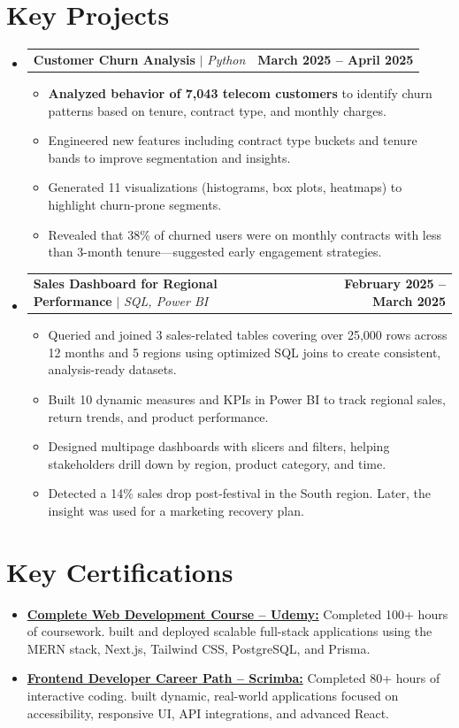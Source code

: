 \documentclass[letterpaper,11pt]{article}
\makeatletter
\newcommand{\resumeItem}[1]{\item\small{{#1 \vspace{-2pt}}}}
\newcommand{\resumeProjectHeading}[2]{
    \item
    \begin{tabular*}{1.001\textwidth}{l@{\extracolsep{\fill}}r}
      \small#1 & \textbf{\small #2}\\
    \end{tabular*}\vspace{-6pt}
}
\newcommand{\resumeItemListStart}{\begin{itemize}}
\newcommand{\resumeItemListEnd}{\end{itemize}\vspace{-5pt}}
\newcommand{\resumeSubHeadingListStart}{\begin{itemize}[leftmargin=0.0in, label={}]}
\newcommand{\resumeSubHeadingListEnd}{\end{itemize}}
\makeatother
\begin{document}
\section{Key Projects}
\resumeSubHeadingListStart
  \resumeProjectHeading
      {\textbf{Customer Churn Analysis} $|$ \emph{Python }}{March 2025 -- April 2025}
      \resumeItemListStart
        \resumeItem{\textbf{Analyzed behavior of 7,043 telecom customers} to identify churn patterns based on tenure, contract type, and monthly charges.}
        \resumeItem{Engineered new features including contract type buckets and tenure bands to improve segmentation and insights.}
        \resumeItem{Generated 11 visualizations (histograms, box plots, heatmaps) to highlight churn-prone segments.}
        \resumeItem{Revealed that 38\% of churned users were on monthly contracts with less than 3-month tenure—suggested early engagement strategies.}
      \resumeItemListEnd
  \resumeProjectHeading
      {\textbf{Sales Dashboard for Regional Performance} $|$ \emph{SQL, Power BI}}{February 2025 -- March 2025}
      \resumeItemListStart
        \resumeItem{Queried and joined 3 sales-related tables covering over 25,000 rows across 12 months and 5 regions using optimized SQL joins to create consistent, analysis-ready datasets.}
        \resumeItem{Built 10 dynamic measures and KPIs in Power BI to track regional sales, return trends, and product performance.}
        \resumeItem{Designed multipage dashboards with slicers and filters, helping stakeholders drill down by region, product category, and time.}
        \resumeItem{Detected a 14\% sales drop post-festival in the South region. Later, the insight was used for a marketing recovery plan.}
      \resumeItemListEnd
\resumeSubHeadingListEnd

\section{Key Certifications}
\resumeItemListStart
  \resumeItem{\href{https://www.udemy.com/certificate/UC-689a510e-ba1f-4bde-a747-4dcb60be473f/}{\textbf{Complete Web Development Course – Udemy:}} Completed 100+ hours of coursework. built and deployed scalable full-stack applications using the MERN stack, Next.js, Tailwind CSS, PostgreSQL, and Prisma.}
  \vspace{-5pt}
  \resumeItem{\href{https://scrimba.com/certificate-cert2uNjfK9m1uNZ5v8RvYFqLcn2NxZ2keLE9bE}{\textbf{Frontend Developer Career Path – Scrimba:}} Completed 80+ hours of interactive coding. built dynamic, real-world applications focused on accessibility, responsive UI, API integrations, and advanced React.}
\resumeItemListEnd
\end{document}
